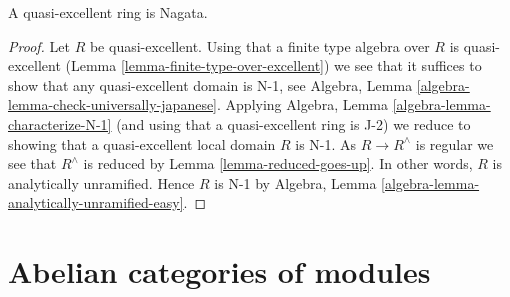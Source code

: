 \begin{lemma}
\label{lemma-quasi-excellent-nagata}
A quasi-excellent ring is Nagata.
\end{lemma}

\begin{proof}
Let $R$ be quasi-excellent.
Using that a finite type algebra over $R$ is quasi-excellent
(Lemma \ref{lemma-finite-type-over-excellent}) we see that
it suffices to show that any quasi-excellent domain is N-1, see
Algebra, Lemma \ref{algebra-lemma-check-universally-japanese}.
Applying Algebra, Lemma \ref{algebra-lemma-characterize-N-1}
(and using that a quasi-excellent ring is J-2) we reduce
to showing that a quasi-excellent local domain $R$ is N-1.
As $R \to R^\wedge$ is regular we see that $R^\wedge$
is reduced by Lemma \ref{lemma-reduced-goes-up}.
In other words, $R$ is analytically unramified.
Hence $R$ is N-1 by
Algebra, Lemma \ref{algebra-lemma-analytically-unramified-easy}.
\end{proof}





\section{Abelian categories of modules}
\label{section-abelian-categories-modules}

